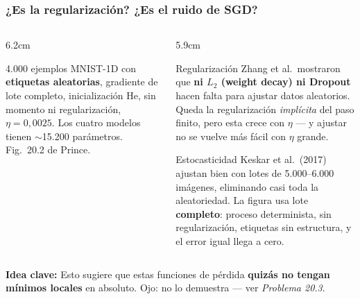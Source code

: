 \documentclass[aspectratio=169, 10pt]{beamer}
\newcommand{\idea}[1]{%
	\begin{tcolorbox}[colback=AccentGreen!6, colframe=AccentGreen, arc=3pt,
		width=\textwidth, boxsep=1pt, left=5pt, right=5pt, top=2pt, bottom=2pt,
		fontupper=\small]
		\RaggedRight\textbf{Idea clave:} #1
	\end{tcolorbox}
}
\newcommand{\fuente}[1]{{\scriptsize\color{StanfordGray}#1}}
\begin{document}
\begin{frame}
\frametitle{¿Es la regularización? ¿Es el ruido de SGD?}
\footnotesize %
\begin{columns}[c]
\begin{column}{6.2cm}
\begin{center}
\end{center}
\vspace{-0.4em}
\fuente{4.000 ejemplos MNIST-1D con \textbf{etiquetas aleatorias}, gradiente de lote completo, inicializaci\'on He, sin momento ni regularizaci\'on, $\eta=0{,}0025$. Los cuatro modelos tienen $\sim$15.200 par\'ametros. Fig.~20.2 de Prince.}
\end{column}
\begin{column}{5.9cm}
\begin{block}{Regularización}
\footnotesize
Zhang et al.\ mostraron que \textbf{ni $L_2$ (weight decay) ni Dropout} hacen falta para ajustar datos aleatorios. Queda la regularizaci\'on \emph{impl\'icita} del paso finito, pero esta crece con $\eta$ --- y ajustar no se vuelve m\'as f\'acil con $\eta$ grande.
\end{block}
\begin{block}{Estocasticidad}
\footnotesize
Keskar et al.\ (2017) ajustan bien con lotes de 5.000--6.000 im\'agenes, eliminando casi toda la aleatoriedad. La figura usa lote \textbf{completo}: proceso determinista, sin regularizaci\'on, etiquetas sin estructura, y el error igual llega a cero.
\end{block}
\end{column}
\end{columns}
\vspace{0.2em}
\idea{Esto sugiere que estas funciones de p\'erdida \textbf{quiz\'as no tengan m\'inimos locales} en absoluto. Ojo: no lo demuestra --- ver \emph{Problema 20.3}.}
\end{frame}
\end{document}
